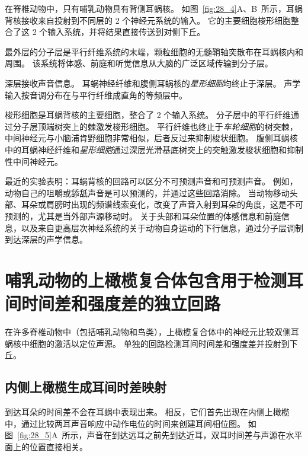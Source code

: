 在脊椎动物中，只有哺乳动物具有背侧耳蜗核。
如图~\ref{fig:28_4}A、B~所示，耳蜗背核接收来自投射到不同层的 2 个神经元系统的输入。
它的主要细胞梭形细胞整合了这 2 个输入系统，并将结果直接传送到对侧下丘。


最外层的分子层是平行纤维系统的末端，颗粒细胞的无髓鞘轴突散布在耳蜗核内和周围。
该系统将体感、前庭和听觉信息从大脑的广泛区域传输到分子层。


深层接收声音信息。
耳蜗神经纤维和腹侧耳蜗核的\textit{星形细胞}均终止于深层。
声学输入按音调分布在与平行纤维成直角的等频层中。


梭形细胞是耳蜗背核的主要细胞，整合了 2 个输入系统。
分子层中的平行纤维通过分子层顶端树突上的棘激发梭形细胞。
平行纤维也终止于\textit{车轮细胞}的树突棘，中间神经元与小脑浦肯野细胞非常相似，后者反过来抑制梭状细胞。
腹侧耳蜗核中的耳蜗神经纤维和\textit{星形细胞}通过深层光滑基底树突上的突触激发梭状细胞和抑制性中间神经元。


最近的实验表明：耳蜗背核的回路可以区分不可预测声音和可预测声音。
例如，动物自己的咀嚼或舔舐声音是可以预测的，并通过这些回路消除。
当动物移动头部、耳朵或肩膀时出现的频谱线索变化，改变了声音入射到耳朵的角度，这是不可预测的，尤其是当外部声源移动时。
关于头部和耳朵位置的体感信息和前庭信息，以及来自更高层次神经系统的关于动物自身运动的下行信息，通过分子层调制到达深层的声学信息。



\section{哺乳动物的上橄榄复合体包含用于检测耳间时间差和强度差的独立回路}

在许多脊椎动物中（包括哺乳动物和鸟类），上橄榄复合体中的神经元比较双侧耳蜗核中细胞的激活以定位声源。
单独的回路检测耳间时间差和强度差并投射到下丘。



\subsection{内侧上橄榄生成耳间时差映射}

到达耳朵的时间差不会在耳蜗中表现出来。
相反，它们首先出现在内侧上橄榄中，通过比较两耳声音响应中动作电位的时间来创建耳间相位图。
如图~\ref{fig:28_5}A~所示，声音在到达远耳之前先到达近耳，双耳时间差与声源在水平面上的位置直接相关。


